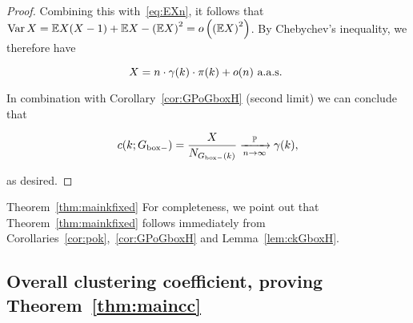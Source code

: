\begin{proof}
\noindent
Combining this with~\eqref{eq:EXn}, it follows that 
$\operatorname{Var} X = {\mathbb E} X(X-1) + {\mathbb E} X - \left({\mathbb E} X\right)^2 = o\left( \left({\mathbb E} X\right)^2 \right)$.
 By Chebychev's inequality, we therefore have 
 
 $$ X = n \cdot \gamma(k) \cdot {\pi}(k) + o(n) \text{ a.a.s. } $$
 
In combination with Corollary~\ref{cor:GPoGboxH} (second limit) we can conclude that

$$ c(k;G_{\mathrm{box}-}) = \frac{X}{N_{G_{\mathrm{box}-}(k)}} \xrightarrow[n\to\infty]{\mathbb{P}} \gamma(k), $$

\noindent
as desired.
 \end{proof}

 
 
 
\begin{proofof}{Theorem~\ref{thm:mainkfixed}}
For completeness, we point out that Theorem~\ref{thm:mainkfixed} follows immediately from 
Corollaries~\ref{cor:pok},~\ref{cor:GPoGboxH} and Lemma~\ref{lem:ckGboxH}.
\end{proofof}




\subsection{Overall clustering coefficient, proving Theorem~\ref{thm:maincc}}

% 
% 
% 


